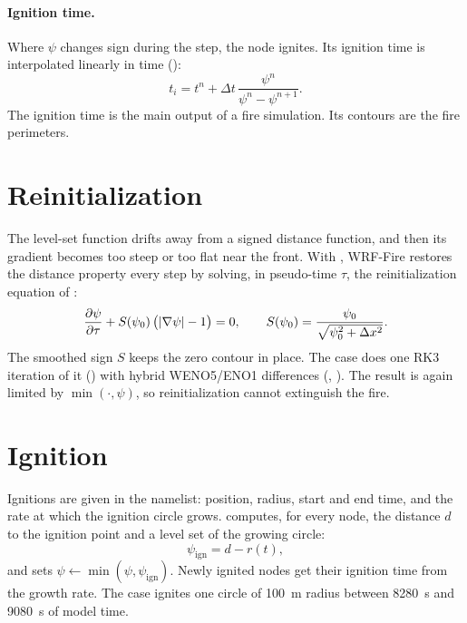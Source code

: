 \paragraph{Ignition time.} Where $\psi$ changes sign during the step, the node ignites. Its ignition time is
interpolated linearly in time ():
\begin{equation}
  t_i = t^n + \Delta t\,\frac{\psi^n}{\psi^n - \psi^{n+1}} .
\end{equation}
The ignition time  is the main output of a fire simulation. Its contours are the fire perimeters.

\section{Reinitialization}

The level-set function drifts away from a signed distance function, and then its gradient becomes too steep or too
flat near the front. With , WRF-Fire restores the distance property every step by solving, in
pseudo-time $\tau$, the reinitialization equation of \citet{sussman1994}:
\begin{equation}
  \frac{\partial \psi}{\partial \tau} + S(\psi_0)\,\bigl(|\nabla\psi| - 1\bigr) = 0, \qquad
  S(\psi_0) = \frac{\psi_0}{\sqrt{\psi_0^2 + \Delta x^2}} .
\end{equation}
The smoothed sign $S$ keeps the zero contour in place. The case does one RK3 iteration of it
() with hybrid WENO5/ENO1 differences
(, ). The result is again limited by
$\min(\cdot, \psi)$, so reinitialization cannot extinguish the fire.

\section{Ignition}

Ignitions are given in the namelist: position, radius, start and end time, and the rate at which the ignition circle
grows.  computes, for every node, the distance $d$ to the ignition point
and a level set of the growing circle:
\begin{equation}
  \psi_{\mathrm{ign}} = d - r(t),
\end{equation}
and sets $\psi \gets \min(\psi, \psi_{\mathrm{ign}})$. Newly ignited nodes get their ignition time from the growth
rate. The case ignites one circle of 100~m radius between 8280~s and 9080~s of model time.

